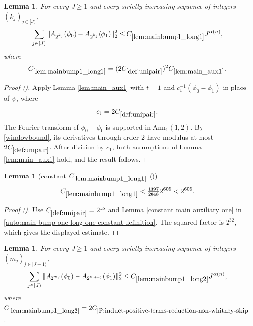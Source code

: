 \documentclass[12pt,reqno]{amsart}
\newcommand{\auto}{{({\tiny\faCar})}}
\theoremstyle{plain}
\newtheorem{lemma}[theorem]{Lemma}
\numberwithin{equation}{section}
\theoremstyle{remark}
\newcommand{\uses}[1]{}
\newcommand{\usesdefs}[1]{}
\begin{document}
\begin{lemma}\label{lem:mainbump1_long1}\uses{lem:main_aux1}\usesdefs{A_def,def:cn-window,def:unipair}
For every $J\ge1$ and every strictly increasing sequence of integers $(k_j)_{j\in[J)}$,
\begin{equation}\label{mainbump1_long1}
\sum_{j\in[J)}\|A_{2^{k_j}}(\phi_0)-A_{2^{k_j}}(\phi_1)\|_2^2
\le C_{\ref{lem:mainbump1_long1}}J^{\alpha(n)},
\end{equation}
where
\begin{equation}\label{auto:main-bump-one-long-one-constant-definition}
C_{\ref{lem:mainbump1_long1}}
=(2C_{\ref{def:unipair}})^2C_{\ref{lem:main_aux1}}.
\end{equation}
\end{lemma}

\begin{proof}[Proof \auto]
Apply Lemma \ref{lem:main_aux1} with $t=1$ and $c_1^{-1}(\phi_0-\phi_1)$ in place of $\psi$, where
\[
c_1=2C_{\ref{def:unipair}}.
\]
The Fourier transform of $\phi_0-\phi_1$ is supported in $\mathrm{Ann}_1(1,2)$. By \eqref{windowbound}, its derivatives through order $2$ have modulus at most $2C_{\ref{def:unipair}}$. After division by $c_1$, both assumptions of Lemma \ref{lem:main_aux1} hold, and the result follows.
\end{proof}

\begin{lemma}[constant $C_{\ref{lem:mainbump1_long1}}$ \auto]\label{constant main bump one long one}\uses{constant main auxiliary one,lem:mainbump1_long1}\usesdefs{def:unipair}
\begin{equation}\label{constant main bump one long one bound}
C_{\ref{lem:mainbump1_long1}}<\tfrac{1397}{2048}2^{605}<2^{605}.
\end{equation}
\end{lemma}
\begin{proof}[Proof \auto]
Use $C_{\ref{def:unipair}}=2^{15}$ and Lemma \ref{constant main auxiliary one} in \eqref{auto:main-bump-one-long-one-constant-definition}. The squared factor is $2^{32}$, which gives the displayed estimate.
\end{proof}

\begin{lemma}\label{lem:mainbump1_long2}\uses{Extension of sequences,A to Lambda,P:induct-positive-terms-reduction-non-whitney-skip,Operations on spaced sequences}\usesdefs{A_def,normalized function tuples,auto:prism-form-definition,multiplicatively spaced monotone sequences,def:unipair}
For every $J\ge 1$ and every strictly increasing sequence of integers $(m_j)_{j\in[J+1)}$,
\begin{equation}\label{mainbump1_long2}
\sum_{j\in[J)} \|
A_{2^{m_{j}}}(\phi_0)-A_{2^{m_{j+1}}}(\phi_1) \|_{2}^2  \le C_{\ref{lem:mainbump1_long2}} J^{\alpha(n)},\end{equation}
where $C_{\ref{lem:mainbump1_long2}}=2 C_{\ref{P:induct-positive-terms-reduction-non-whitney-skip}}$.
\end{lemma}
\end{document}

